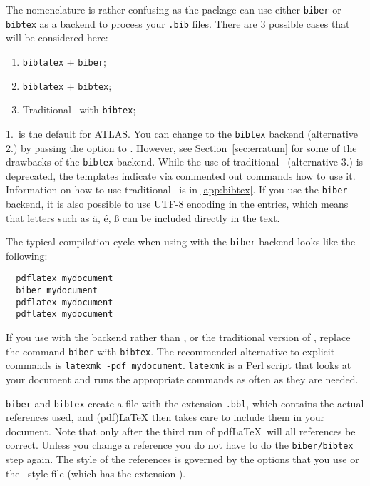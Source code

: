 \documentclass[UKenglish, texlive=2016]{atlasdoc}
\begin{document}
The nomenclature is rather confusing as the package  can use
either \texttt{biber} or \texttt{bibtex} as a backend to process your \texttt{.bib} files.
There are 3 possible cases that will be considered here:
\begin{enumerate}\setlength{\itemsep}{0pt}\setlength{\parskip}{0pt}
  \item \texttt{biblatex} + \texttt{biber};
  \item \texttt{biblatex} + \texttt{bibtex};
  \item Traditional \BibTeX\ with \texttt{bibtex};
\end{enumerate}
 1.\ is the default for ATLAS\@.
You can change to the \texttt{bibtex} backend (alternative 2.) by passing the option
 to .
However, see Section~\ref{sec:erratum} for some of the drawbacks of the \texttt{bibtex} backend.
While the use of traditional \BibTeX\ (alternative 3.) is deprecated,
the templates indicate via commented out commands how to use it.
Information on how to use traditional \BibTeX\ is in \cref{app:bibtex}.
If you use the \texttt{biber} backend, it is also possible to use UTF-8 encoding in the entries, which means that letters such as
ä, é, ß can be included directly in the text.

The typical compilation cycle when using  with the \texttt{biber} backend
looks like the following:
%
\begin{verbatim}
  pdflatex mydocument
  biber mydocument
  pdflatex mydocument
  pdflatex mydocument
\end{verbatim}
If you use  with the backend  rather than ,
or the traditional version of \BibTeX{},
replace the command \texttt{biber} with \texttt{bibtex}.
The recommended alternative to explicit commands is \texttt{latexmk -pdf mydocument}.
\texttt{latexmk} is a Perl script that looks at your document and runs the appropriate
commands as often as they are needed.

\texttt{biber} and \texttt{bibtex} create a file with the extension \texttt{.bbl}, which
contains the actual references used, and (pdf)\LaTeX{} then takes care to include them in your document.
Note that only after the third run of pdf\LaTeX\ will all references be correct.
Unless you change a reference you do not have to do the \texttt{biber/bibtex} step again.
The style of the references is governed by the  options that you
use or the \BibTeX\ style file (which has the extension ).
\end{document}
